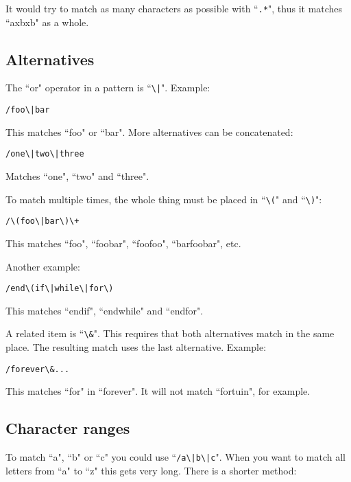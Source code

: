 It would try to match as many characters as possible with ``\texttt{.*}", thus it matches ``axbxb" as a whole.
\subsection{Alternatives}
The ``or" operator in a pattern is ``\texttt{\textbackslash{}|}".
Example:

\begin{Verbatim}[samepage=true]
 /foo\|bar
\end{Verbatim}

This matches ``foo" or ``bar".
More alternatives can be concatenated:

\begin{Verbatim}[samepage=true]
 /one\|two\|three
\end{Verbatim}

Matches ``one", ``two" and ``three".

To match multiple times, the whole thing must be placed in ``\texttt{\textbackslash{}(}" and ``\texttt{\textbackslash{})}":

\begin{Verbatim}[samepage=true]
 /\(foo\|bar\)\+
\end{Verbatim}

This matches ``foo", ``foobar", ``foofoo", ``barfoobar", etc.

Another example:

\begin{Verbatim}[samepage=true]
 /end\(if\|while\|for\)
\end{Verbatim}

This matches ``endif", ``endwhile" and ``endfor".

A related item is ``\texttt{\textbackslash{}\&}".
This requires that both alternatives match in the same place.
The resulting match uses the last alternative.
Example:

\begin{Verbatim}[samepage=true]
 /forever\&...
\end{Verbatim}

This matches ``for" in ``forever".  It will not match ``fortuin", for example.
\subsection{Character ranges}
To match ``a", ``b" or ``c" you could use ``\texttt{/a\textbackslash{}|b\textbackslash{}|c}".
When you want to match all letters from ``a" to ``z" this gets very long.
There is a shorter method:


